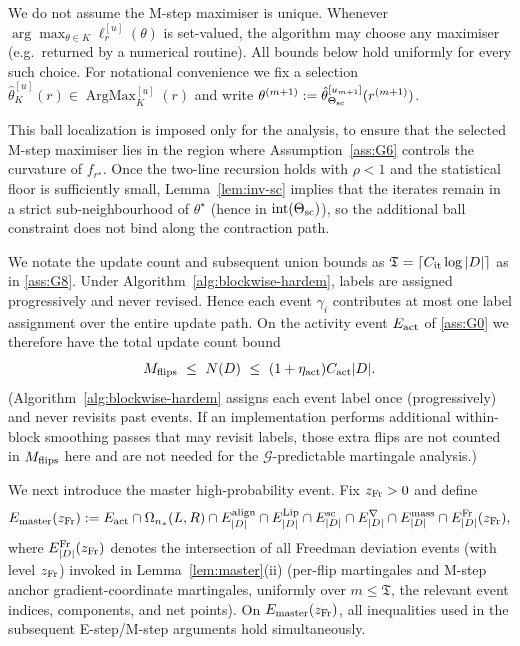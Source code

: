 \documentclass{statsoc}
\newcommand{\1}{\mathbbm{1}}
\newcommand{\Tmax}{\mathfrak{T}}
\begin{document}
We do not assume the M-step maximiser is unique. Whenever $\arg\max_{\theta\in K}\ell_r^{[u]}(\theta)$ is set-valued, the algorithm may choose any maximiser (e.g.\ returned by a numerical routine). All bounds below hold uniformly for
every such choice. For notational convenience we fix a selection $\hat\theta_K^{[u]}(r)\in\operatorname{ArgMax}_K^{[u]}(r)$ and write $\theta^{(m+1)}:=\hat\theta_{\Theta_{\rm sc}}^{[u_{m+1}]}(r^{(m+1)})$.

This ball localization is imposed only for the analysis, to ensure that the selected M-step maximiser lies in the region where Assumption~\ref{ass:G6} controls the curvature of $f_{r^\star}$. Once the two-line recursion holds with $\rho<1$ and the statistical floor is sufficiently small, Lemma~\ref{lem:inv-sc} implies that the iterates remain in a strict sub-neighbourhood of $\theta^\star$ (hence in $\operatorname{int}(\Theta_{\rm sc})$), so the additional ball constraint does not bind along the contraction path.


We notate the update count and subsequent union bounds as $\Tmax=\lceil C_{\rm it}\log|D|\rceil$ as in \cref{ass:G8}. Under Algorithm~\ref{alg:blockwise-hardem}, labels are assigned progressively and never revised.
Hence each event $\gamma_i$ contributes at most one label assignment over the entire update path.
On the activity event $E_{\rm act}$ of \cref{ass:G0} we therefore have the total update count bound
\begin{equation}\label{eq:flipcount}
M_{\rm flips}\ \le\ N(D)\ \le\ (1+\eta_{\rm act}) C_{\rm act} |D|.
\end{equation}
(Algorithm~\ref{alg:blockwise-hardem} assigns each event label once (progressively) and never revisits past events.
If an implementation performs additional within-block smoothing passes that may revisit labels, those extra flips are not counted in $M_{\rm flips}$ here and are not needed for the $\mathcal G$-predictable martingale analysis.)


We next introduce the master high-probability event.
Fix $z_{\rm Fr}>0$ and define
\[
E_{\mathrm{master}}(z_{\rm Fr})
:=E_{\rm act}\cap \Omega_{n_*}(L,R)\cap E^{\rm align}_{|D|}
\cap E^{\rm Lip}_{|D|}\cap E^{\rm sc}_{|D|}\cap E^{\nabla}_{|D|}\cap E^{\rm mass}_{|D|}
\cap E^{\rm Fr}_{|D|}(z_{\rm Fr}),
\]
where $E^{\rm Fr}_{|D|}(z_{\rm Fr})$ denotes the intersection of all Freedman deviation events (with level $z_{\rm Fr}$)
invoked in Lemma~\ref{lem:master}(ii) (per-flip martingales and M-step anchor gradient-coordinate martingales,
uniformly over $m\le\Tmax$, the relevant event indices, components, and net points).
On $E_{\mathrm{master}}(z_{\rm Fr})$, all inequalities used in the subsequent E-step/M-step arguments hold simultaneously.
\end{document}
